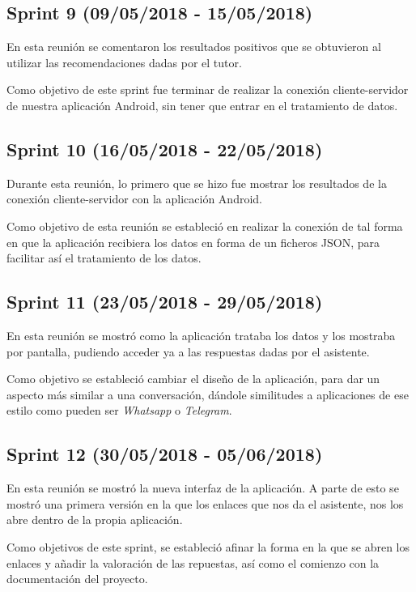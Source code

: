 \subsection{Sprint 9 (09/05/2018 - 15/05/2018)}

En esta reunión se comentaron los resultados positivos que se obtuvieron al utilizar las recomendaciones dadas por el tutor.

Como objetivo de este sprint fue terminar de realizar la conexión cliente-servidor de nuestra aplicación Android, sin tener que entrar en el tratamiento de datos.

\subsection{Sprint 10 (16/05/2018 - 22/05/2018)}

Durante esta reunión, lo primero que se hizo fue mostrar los resultados de la conexión cliente-servidor con la aplicación Android.

Como objetivo de esta reunión se estableció en realizar la conexión de tal forma en que la aplicación recibiera los datos en forma de un ficheros JSON, para facilitar así el tratamiento de los datos.

\subsection{Sprint 11 (23/05/2018 - 29/05/2018)}

En esta reunión se mostró como la aplicación trataba los datos y los mostraba por pantalla, pudiendo acceder ya a las respuestas dadas por el asistente.

Como objetivo se estableció cambiar el diseño de la aplicación, para dar un aspecto más similar a una conversación, dándole similitudes a aplicaciones de ese estilo como pueden ser \textit{Whatsapp} o \textit{Telegram}.

\subsection{Sprint 12 (30/05/2018 - 05/06/2018)}

En esta reunión se mostró la nueva interfaz de la aplicación. A parte de esto se mostró una primera versión en la que los enlaces que nos da el asistente, nos los abre dentro de la propia aplicación.

Como objetivos de este sprint, se estableció afinar la forma en la que se abren los enlaces y añadir la valoración de las repuestas, así como el comienzo con la documentación del proyecto.

